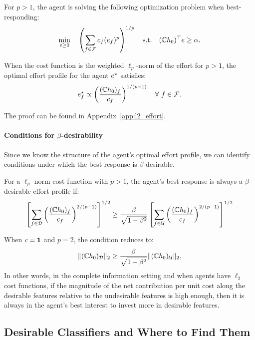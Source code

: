 For $p > 1$, the agent is solving the following optimization problem when best-responding:  
\begin{align}\label{opt:q_norm}
    \min_{e \geq 0} \quad \left(\sum_{f \in \mathcal{F}}c_f (e_f)^p\right)^{1/p} \quad 
    \text{s.t.} \quad (\mathbb{C} h_0)^{\top}e \geq \alpha.
\end{align}
\begin{lem}\label{lem:l2_effort}
When the cost function is the weighted $\ell_p$-norm of the effort for $p > 1$, the optimal effort profile for the agent $e^{\star}$ satisfies: 
\[
        e^{\star}_f \propto \left( \frac{(\mathbb{C} h_0)_f}{c_f} \right)^{1/(p-1)} \quad \forall~f \in \mathcal{F}.
\]
\end{lem}


The proof can be found in Appendix~\ref{app:l2_effort}.



\paragraph{Conditions for $\beta$-desirability} Since we know the structure of the agent's optimal effort profile, we can identify conditions under which the best response is $\beta$-desirable. 
\begin{thm}\label{thm:l2_good}
For a $\ell_p$-norm cost function with $p > 1$, the agent's best response is always a $\beta$-desirable effort profile if:  
\[
    \left[ \sum_{f \in \mathcal{D}} \left( \frac{(\mathbb{C} h_0)_f}{c_f} \right)^{2/(p-1)} \right]^{1/2} \geq \frac{\beta}{\sqrt{1-\beta^2}}  \left[ \sum_{f \in \mathcal{U}} \left( \frac{(\mathbb{C} h_0)_f}{c_f} \right)^{2/(p-1)} \right]^{1/2}
\]
\end{thm}
\noindent
When $c = \bf{1}$ and $p = 2$, the condition reduces to: 
\[
       \lVert(\mathbb{C} h_0)_{\mathcal{D}}\rVert_2 \geq \frac{\beta}{\sqrt{1-\beta^2}}\lVert(\mathbb{C} h_0)_{\mathcal{U}}\rVert_2,
\]
In other words, in the complete information setting and when agents have $\ell_2$ cost functions, if the magnitude of the net contribution per unit cost along the desirable features relative to the undesirable features is high enough, then it is always in the agent's best interest to invest more in desirable features. 

\subsection{Desirable Classifiers and Where to Find Them}

